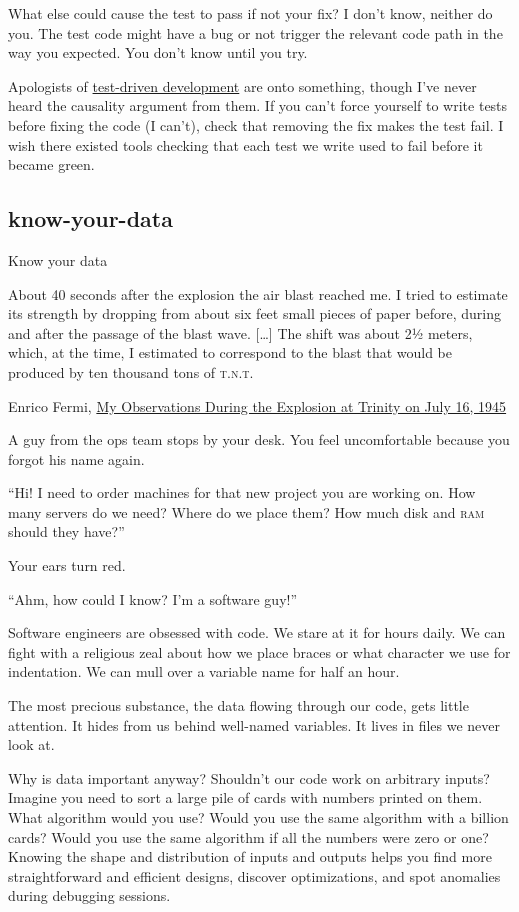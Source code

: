 \documentclass{article}
\begin{document}
What else could cause the test to pass if not your fix?
I don't know, neither do you.
The test code might have a bug or not trigger the relevant code path in the way you expected.
You don't know until you try.

Apologists of \href{https://en.wikipedia.org/wiki/Test-driven_development}{test-driven development} are onto something,
though I've never heard the causality argument from them.
If you can't force yourself to write tests before fixing the code (I can't),
check that removing the fix makes the test fail.
I wish there existed tools checking that each test we write used to fail before it became green.

\subsection{know-your-data}{Know your data}
\epigraph{
  About 40 seconds after the explosion the air blast reached me.
  I tried to estimate its strength by dropping from about six feet small pieces of paper before, during and after the passage of the blast wave.
  [\ldots]
  The shift was about 2½ meters, which, at the time, I estimated to correspond to the blast that would be produced by ten thousand tons of \textsc{t.n.t.}
}{Enrico Fermi, \href{https://www.atomicarchive.com/resources/documents/trinity/fermi.html}{My Observations During the Explosion at Trinity on July 16, 1945}}

A guy from the ops team stops by your desk. You feel uncomfortable because you forgot his name again.

``Hi! I need to order machines for that new project you are working on.
How many servers do we need?
Where do we place them?
How much disk and \textsc{ram} should they have?''

Your ears turn red.

``Ahm, how could I know? I'm a software guy!''

Software engineers are obsessed with code.
We stare at it for hours daily.
We can fight with a religious zeal about how we place braces or what character we use for indentation.
We can mull over a variable name for half an hour.

The most precious substance, the data flowing through our code, gets little attention.
It hides from us behind well-named variables.
It lives in files we never look at.

Why is data important anyway?
Shouldn't our code work on arbitrary inputs?
Imagine you need to sort a large pile of cards with numbers printed on them.
What algorithm would you use?
Would you use the same algorithm with a billion cards?
Would you use the same algorithm if all the numbers were zero or one?
Knowing the shape and distribution of inputs and outputs helps you find more straightforward and efficient designs, discover optimizations, and spot anomalies during debugging sessions.
\end{document}
